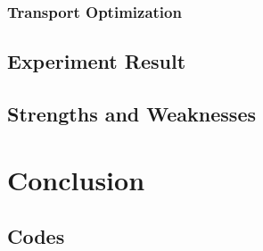 \subsubsection{Transport Optimization}
\subsection{Experiment Result}
\subsection{Strengths and Weaknesses}

\section{Conclusion}


\begin{appendices}
\section{Codes}
%
%
%
\end{appendices}